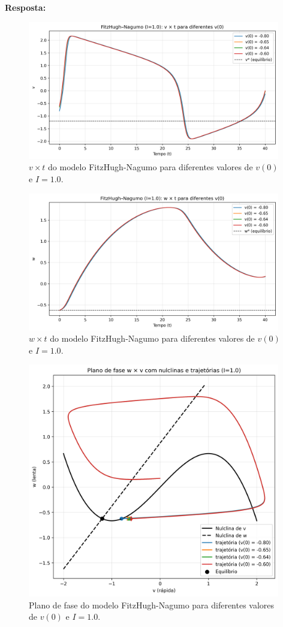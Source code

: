 \documentclass[english,11pt,a4paper]{article}
\begin{document}
	\noindent\textbf{Resposta:}
	
	\begin{figure}[H]
		\centering
		\includegraphics[width=11cm]{../figures/ex_1j_I1.0_1.png}
		\caption{$v \times t$ do modelo FitzHugh-Nagumo para diferentes valores de $v(0)$ e $I = 1.0$.}
	\end{figure}
	
	\begin{figure}[H]
		\centering
		\includegraphics[width=11cm]{../figures/ex_1j_I1.0_2.png}
		\caption{$w \times t$ do modelo FitzHugh-Nagumo para diferentes valores de $v(0)$ e $I = 1.0$.}
	\end{figure}
	
	\begin{figure}[H]
		\centering
		\includegraphics[width=11cm]{../figures/ex_1j_I1.0_3.png}
		\caption{Plano de fase do modelo FitzHugh-Nagumo para diferentes valores de $v(0)$ e $I = 1.0$.}
	\end{figure}
	
\end{document}
